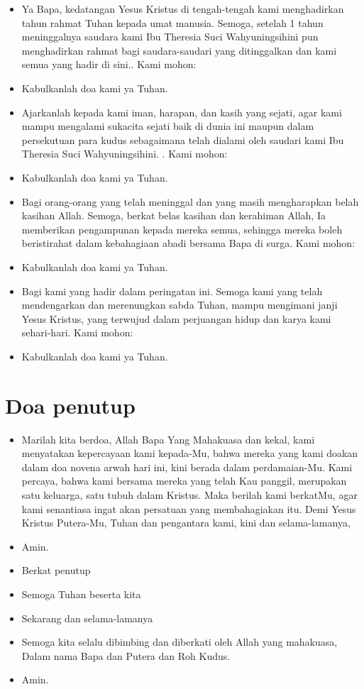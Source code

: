 \documentclass[a4paper, 12pt]{article}
\newcommand{\BU}[1]{\begin{itemize} \item[U:] #1 \end{itemize}}
\newcommand{\BP}[1]{\begin{itemize} \item[P:] #1 \end{itemize}}
\newcommand{\arwah}{Ibu Theresia Suci Wahyuningsih}
\begin{document}
\BP{Ya Bapa, kedatangan Yesus Kristus di tengah-tengah kami menghadirkan tahun rahmat Tuhan kepada umat manusia. Semoga, setelah 1 tahun meninggalnya saudara kami \arwah ini pun menghadirkan rahmat bagi saudara-saudari yang ditinggalkan dan kami semua yang hadir di sini.. Kami mohon:}

\BU{Kabulkanlah doa kami ya Tuhan.}

\BP{Ajarkanlah kepada kami iman, harapan, dan kasih yang sejati, agar kami mampu mengalami sukacita sejati baik di dunia ini maupun dalam persekutuan para kudus sebagaimana telah dialami oleh saudari kami \arwah ini. . Kami mohon:}

\BU{Kabulkanlah doa kami ya Tuhan.}

\BP{Bagi orang-orang yang telah meninggal dan
yang masih mengharapkan belah kasihan Allah.
Semoga, berkat belas kasihan dan kerahiman
Allah, Ia memberikan pengampunan kepada
mereka semua, sehingga mereka boleh beristirahat dalam kebahagiaan abadi bersama Bapa
di surga. Kami mohon:}

\BU{Kabulkanlah doa kami ya Tuhan.}

\BP{Bagi kami yang hadir dalam peringatan ini.
Semoga kami yang telah mendengarkan dan merenungkan sabda Tuhan, mampu mengimani
janji Yesus Kristus, yang terwujud dalam perjuangan hidup dan karya kami sehari-hari.
Kami mohon:}

\BU{Kabulkanlah doa kami ya Tuhan.}


\section*{Doa penutup}
\BP{Marilah kita berdoa,
	Allah Bapa Yang Mahakuasa dan kekal,
	kami menyatakan kepercayaan kami kepada-Mu,
	bahwa mereka yang kami doakan
	dalam doa novena arwah hari ini,
	kini berada dalam perdamaian-Mu.
	Kami percaya, bahwa kami bersama mereka
	yang telah Kau panggil, merupakan satu keluarga,
	satu tubuh dalam Kristus.
	Maka berilah kami berkatMu, agar kami senantiasa ingat akan persatuan yang membahagiakan itu.
	Demi Yesus Kristus Putera-Mu, Tuhan dan pengantara kami, kini dan selama-lamanya,}
\BU{Amin.}
	
\BP{Berkat penutup}
\BP{Semoga Tuhan beserta kita}
\BU{Sekarang dan selama-lamanya}
\BP{Semoga kita selalu dibimbing dan diberkati oleh Allah yang mahakuasa, Dalam nama Bapa dan Putera dan Roh Kudus.}
\BU{Amin.}
\end{document}
